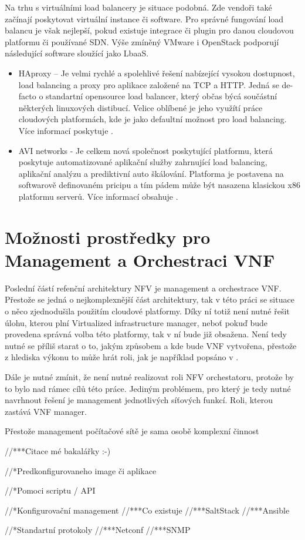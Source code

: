 Na trhu s virtuálními load balancery je situace podobná. Zde vendoři také začínají poskytovat virtuální instance či software. Pro správné fungování load balancu je však nejlepší, pokud existuje integrace či plugin pro danou cloudovou platformu či používané SDN. Výše zmíněný VMware i OpenStack podporují následující software sloužící jako LbaaS.

\begin{itemize}
\item HAproxy – Je velmi rychlé a spolehlivé řešení nabízející vysokou dostupnost, load balancing a proxy pro aplikace založené na TCP a HTTP. Jedná se de-facto o standartní opensource load balancer, který občas býcá součástní některých linuxových distibucí. Velice oblíbené je jeho využítí práce cloudových platformách, kde je jako defaultní možnost pro load balancing. Více informací poskytuje \cite{HAproxy} .
\item AVI networks - Je celkem nová společnost poskytující platformu, která poskytuje automatizované aplikační služby zahrnující load balancing, aplikační analýzu a prediktivní auto škálování. Platforma je postavena na softwarově definovaném pricipu a tím pádem může být nasazena klasickou x86 platformu serverů. Více informací obsahuje \cite{avi_networks} .
\end{itemize}

\section{Možnosti prostředky pro Management a Orchestraci VNF} \label{sec:MANO}

Poslední částí refenční architektury NFV je management a orchestrace VNF. Přestože se jedná o nejkomplexnější část architektury, tak v této práci se situace o něco zjednodušila použitím cloudové platformy. Díky ní totiž není nutné řešit úlohu, kterou plní Virtualized infrastructure manager, neboť pokuď bude provedena správná volba této platformy, tak v ní bude již obsažena. Není tedy nutné se příliš starat o to, jakým způsobem a kde bude VNF vytvořena, přestože z hlediska výkonu to může hrát roli, jak je například popsáno v \cite{vnf_placement} .

Dále je nutné zmínit, že není nutné realizovat roli NFV orchestatoru, protože by to bylo nad rámec cílů této práce. Jediným problémem, pro který je tedy nutné navrhnout řešení je management jednotlivých síťových funkcí. Roli, kterou zastává VNF manager.

Přestože management počítačové sítě je sama osobě komplexní činnost

//***Citace mé bakalářky :-)

//*Predkonfigurovaneho image či aplikace

//*Pomoci scriptu / API

//*Konfigurovační management
//***Co existuje
//***SaltStack
//***Ansible

//*Standartní protokoly
//***Netconf
//***SNMP




